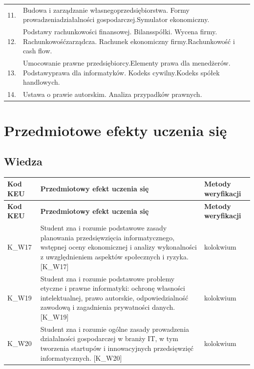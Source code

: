 \documentclass[12pt, a4paper]{article}
\newcommand{\thdrule}{\noalign{\global\setlength{\extrarowheight}{0pt}}}
\newcommand{\thdend}{\noalign{\global\setlength{\extrarowheight}{3pt}}}
\begin{document}
{\begin{longtable}{m{1.5cm}m{14.5cm}}
  \rowcolor{tableRowLight} 11. & Budowa i zarządzanie własnegoprzedsiębiorstwa. Formy prowadzeniadziałalności gospodarczej.Symulator ekonomiczny. \\
  \rowcolor{tableRowAlt} 12. & Podstawy rachunkowości finansowej. Bilansspółki. Wycena firmy. Rachunkowośćzarządcza. Rachunek ekonomiczny firmy.Rachunkowość i cash flow. \\
  \rowcolor{tableRowLight} 13. & Umocowanie prawne przedsiębiorcy.Elementy prawa dla menedżerów. Podstawyprawa dla informatyków. Kodeks cywilny.Kodeks spółek handlowych. \\
  \rowcolor{tableRowAlt} 14. & Ustawa o prawie autorskim. Analiza przypadków prawnych. \\
\bottomrule
\end{longtable}}

\section{Przedmiotowe efekty uczenia się}

\subsection*{Wiedza}
{\scriptsize
\begin{longtable}{m{1.6cm}m{9.0cm}m{4.2cm}}
\thdrule\toprule
\rowcolor{pjatkRed} {\color{white}\footnotesize\textbf{\vphantom{Ag}Kod KEU}} & {\color{white}\footnotesize\textbf{\vphantom{Ag}Przedmiotowy efekt uczenia się}} & {\color{white}\footnotesize\textbf{\vphantom{Ag}Metody weryfikacji}} \\
\midrule\thdend
\endfirsthead
\thdrule\toprule
\rowcolor{pjatkRed} {\color{white}\footnotesize\textbf{\vphantom{Ag}Kod KEU}} & {\color{white}\footnotesize\textbf{\vphantom{Ag}Przedmiotowy efekt uczenia się}} & {\color{white}\footnotesize\textbf{\vphantom{Ag}Metody weryfikacji}} \\
\midrule\thdend
\endhead
  \rowcolor{tableRowLight} K\_W17 & Student zna i rozumie podstawowe zasady planowania przedsięwzięcia informatycznego, wstępnej oceny ekonomicznej i analizy wykonalności z uwzględnieniem aspektów społecznych i ryzyka. {[}K\_W17{]} & kolokwium \\
  \rowcolor{tableRowAlt} K\_W19 & Student zna i rozumie podstawowe problemy etyczne i prawne informatyki: ochronę własności intelektualnej, prawo autorskie, odpowiedzialność zawodową i zagadnienia prywatności danych. {[}K\_W19{]} & kolokwium \\
  \rowcolor{tableRowLight} K\_W20 & Student zna i rozumie ogólne zasady prowadzenia działalności gospodarczej w branży IT, w tym tworzenia startupów i innowacyjnych przedsięwzięć informatycznych. {[}K\_W20{]} & kolokwium \\
\bottomrule
\end{longtable}}
\end{document}

